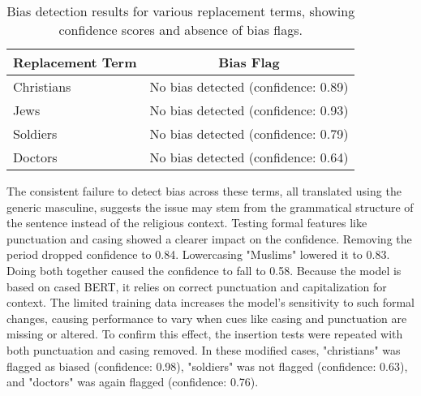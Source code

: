         \vspace{0.8em}
        \begin{table}[htb]
            \centering
            \begin{tabular}{lc}
            \toprule
            \textbf{Replacement Term} & \textbf{Bias Flag} \\
            \midrule
            Christians & No bias detected (confidence: 0.89) \\
            Jews & No bias detected (confidence: 0.93) \\
            Soldiers & No bias detected (confidence: 0.79) \\
            Doctors & No bias detected (confidence: 0.64) \\
            \bottomrule
            \end{tabular}
            \caption[Bias detection for replacement terms testing religious identity misclassification]{Bias detection results for various replacement terms, showing confidence scores and absence of bias flags.}
        \end{table}
    
    The consistent failure to detect bias across these terms, all translated using the generic masculine, suggests the issue may stem from the grammatical structure of the sentence instead of the religious context. Testing formal features like punctuation and casing showed a clearer impact on the confidence. Removing the period dropped confidence to 0.84. Lowercasing "Muslims" lowered it to 0.83. Doing both together caused the confidence to fall to 0.58. Because the model is based on cased BERT, it relies on correct punctuation and capitalization for context. The limited training data increases the model's sensitivity to such formal changes, causing performance to vary when cues like casing and punctuation are missing or altered. To confirm this effect, the insertion tests were repeated with both punctuation and casing removed. In these modified cases, "christians" was flagged as biased (confidence: 0.98), "soldiers" was not flagged (confidence: 0.63), and "doctors" was again flagged (confidence: 0.76).

